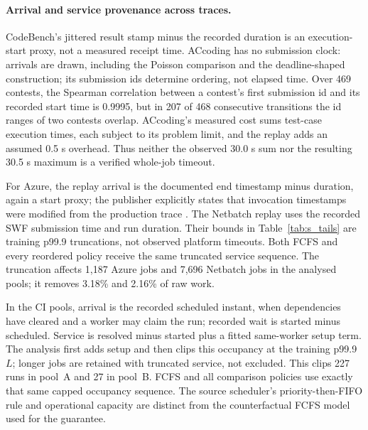 \documentclass[mathematics,supfile,submit,moreauthors]{Definitions/mdpi}
\newcommand{\devnum}[1]{#1}
\begin{document}
\paragraph{Arrival and service provenance across traces.}
CodeBench's jittered result stamp minus the recorded duration is an execution-start
proxy, not a measured receipt time. ACcoding has no submission clock: arrivals are
drawn, including the Poisson comparison and the deadline-shaped construction; its
submission ids determine ordering, not elapsed time. Over \devnum{469} contests, the
Spearman correlation between a contest's first submission id and its recorded start time
is \devnum{0.9995}, but in \devnum{207} of \devnum{468} consecutive transitions the id
ranges of two contests overlap.
ACcoding's measured cost sums test-case execution times, each subject to its problem limit, and the replay adds an
assumed \devnum{0.5} s overhead. Thus neither the observed \devnum{30.0} s sum nor
the resulting \devnum{30.5} s maximum is a verified whole-job timeout.

For Azure, the replay arrival is the documented end timestamp minus duration,
again a start proxy; the publisher explicitly states that invocation timestamps
were modified from the production trace \cite{azure2021trace}. The Netbatch replay
uses the recorded SWF submission time and run duration. Their bounds in
Table~\ref{tab:s_tails} are training p99.9 truncations, not observed platform timeouts.
Both FCFS and every reordered policy receive the same truncated service sequence.
The truncation affects \devnum{1{,}187} Azure jobs and \devnum{7{,}696} Netbatch jobs
in the analysed pools; it removes \devnum{3.18\%} and \devnum{2.16\%} of raw work.

In the CI pools, arrival is the recorded scheduled instant, when dependencies have
cleared and a worker may claim the run; recorded wait is started minus scheduled.
Service is resolved minus started plus a fitted same-worker setup term. The analysis
first adds setup and then clips this occupancy at the training p99.9 $L$;
longer jobs are retained with truncated service, not excluded. This clips
\devnum{227} runs in pool~A and \devnum{27} in pool~B. FCFS and all comparison
policies use exactly that same capped occupancy sequence. The source scheduler's
priority-then-FIFO rule and operational capacity are distinct from the counterfactual
FCFS model used for the guarantee.
\end{document}
